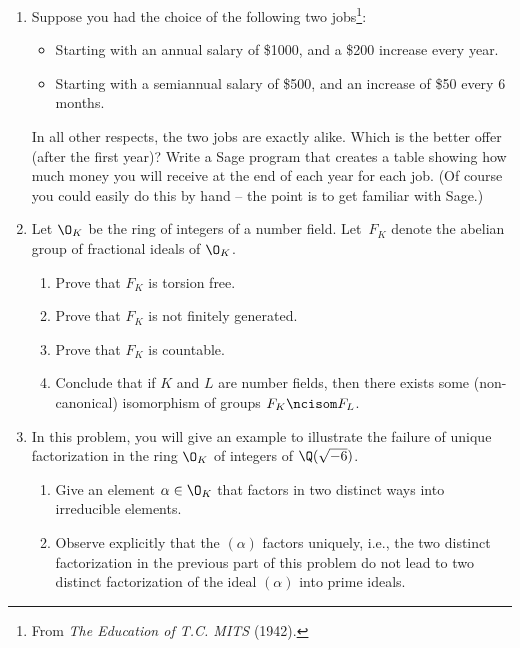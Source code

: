 \begin{enumerate}

\item Suppose you had the choice of the following two jobs\footnote{From {\em The Education of T.C. MITS} (1942).}:
\begin{itemize}
\item[Job 1] Starting with an annual salary of \$1000,
and a \$200 increase every year.
\item[Job 2] Starting with a semiannual salary of \$500,
and an increase of \$50 every 6 months.
\end{itemize}
In all other respects, the two jobs are exactly alike.
Which is the better offer (after the first year)?  
Write a Sage program that creates a table showing how
much money you will receive at the end of each year for
each job. (Of course you could easily do this by hand -- the
point is to get familiar with Sage.)

\item Let $\O_K$ be the ring of integers of a number field.
Let~$F_K$ denote the abelian group of fractional ideals of $\O_K$.
\begin{enumerate}
\item Prove that $F_K$ is torsion free.
\item Prove that $F_K$ is not finitely generated.
\item Prove that $F_K$ is countable.
\item Conclude that if $K$ and $L$ are number fields, then there
exists some (non-canonical) isomorphism of groups $F_K\ncisom F_L$.
\end{enumerate}


\item In this problem, you will give an example to illustrate the
  failure of unique factorization in the ring $\O_K$ of integers of
  $\Q(\sqrt{-6})$.
\begin{enumerate}
\item Give an element $\alpha \in \O_K$ that factors in two distinct
  ways into irreducible elements.  
\item Observe explicitly that the $(\alpha)$ factors uniquely, i.e.,
  the two distinct factorization in the previous part of this problem
  do not lead to two distinct factorization of the ideal $(\alpha)$
  into prime ideals.
\end{enumerate}



\end{enumerate}

